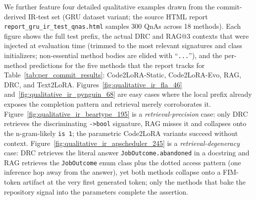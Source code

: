 \documentclass[11pt]{article}
\newcommand{\codelora}{Code2LoRA\xspace}
\newcommand{\codelorastatic}{\codelora-Static\xspace}
\newcommand{\codeloraevo}{\codelora-Evo\xspace}
\newcommand{\textlora}{Text2LoRA\xspace}
\begin{document}
We further feature four detailed qualitative examples drawn from the commit-derived IR-test set (GRU dataset variant; the source HTML report \texttt{report\_gru\_ir\_test\_qnas.html} samples 300 QnAs across 18 methods).
Each figure shows the full test prefix, the actual DRC and RAG@3 contexts that were injected at evaluation time (trimmed to the most relevant signatures and class initializers; non-essential method bodies are elided with ``\texttt{...}''), and the per-method predictions for the five methods that the report tracks for Table~\ref{tab:per_commit_results}: \codelorastatic{}, \codeloraevo{}, RAG, DRC, and \textlora{}.
Figures~\ref{fig:qualitative_ir_fla_46} and~\ref{fig:qualitative_ir_pynguin_68} are easy cases where the local prefix already exposes the completion pattern and retrieval merely corroborates it.
Figure~\ref{fig:qualitative_ir_beartype_195} is a \emph{retrieval-precision} case: only DRC retrieves the discriminating \texttt{->\;bool} signature, RAG misses it and collapses onto the n-gram-likely \texttt{is 1}; the parametric \codelora{} variants succeed without context.
Figure~\ref{fig:qualitative_ir_apscheduler_245} is a \emph{retrieval-degeneracy} case: DRC retrieves the literal answer \texttt{JobOutcome.abandoned} in a docstring and RAG retrieves the \texttt{JobOutcome} enum class plus the dotted access pattern (one inference hop away from the answer), yet both methods collapse onto a FIM-token artifact at the very first generated token; only the methods that bake the repository signal into the parameters complete the assertion.
\end{document}
